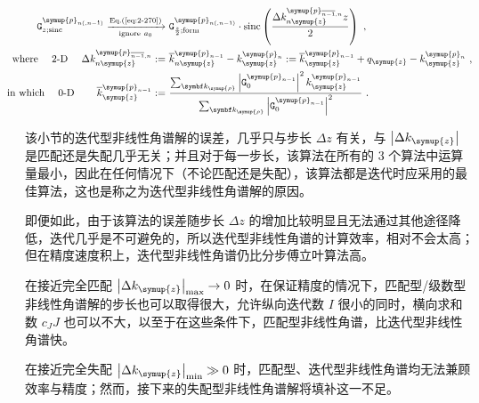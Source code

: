 \begin{subequations} \label{eq:2-287}
	\abovedisplayskip=13pt
	\belowdisplayskip=13pt
	\begin{align}
		\hspace{-1.8em} {\mathtt{G}}^{\symup{p}_{n(,n-1)}}_{z;\text{sinc}} \xrightarrow[\text{ignore}\ a_0]{\text{Eq.(\ref{eq:2-270})}} &\ {\mathtt{G}}^{\symup{p}_{n(,n-1)}}_{\frac{ z }{ 2 };\text{form}} \cdot \text{sinc} \left( \frac{ \Delta k^{\symup{p}_{\overline{n-1},n}}_{n\symup{z}} z }{ 2 } \right) \label{eq:2-287a}~, \\ \hspace{-1.8em} \text{where}\ \ \ \ \text{2-D}\ \ \ \ \Delta k^{\symup{p}_{\overline{n-1},n}}_{n\symup{z}} :=&\ \overline{k}^{\symup{p}_{n-1}}_{n\symup{z}} - k^{\symup{p}_{n}}_{\symup{z}} := \overline{k}^{\symup{p}_{n-1}}_{\symup{z}} + q_{\symup{z}} - k^{\symup{p}_{n}}_{\symup{z}} \label{eq:2-287b}~, \\ \hspace{-1.8em} \text{in which} \ \ \ \ \text{0-D} \hspace{2.2em} \overline{k}^{\symup{p}_{n-1}}_{\symup{z}} :=&\ \frac{ \sum_{\symbf k_{\symup{\rho}}} \left| {\mathtt{G}}^{\symup{p}_{n-1}}_{0} \right|^2 k^{\symup{p}_{n-1}}_{\symup{z}} }{ \sum_{\symbf k_{\symup{\rho}}} \left| {\mathtt{G}}^{\symup{p}_{n-1}}_{0} \right|^2 } \label{eq:2-287c}~.
	\end{align}
\end{subequations}

该小节的迭代型非线性角谱解的误差，几乎只与步长 $\Delta z$ 有关，与 $\left|\Delta k_{\symup{z}}\right|$ 是匹配还是失配几乎无关；并且对于每一步长，该算法在所有的 3 个算法中运算量最小，因此在任何情况下（不论匹配还是失配），该算法都是迭代时应采用的最佳算法，这也是称之为迭代型非线性角谱解的原因。

即便如此，由于该算法的误差随步长 $\Delta z$ 的增加比较明显且无法通过其他途径降低，迭代几乎是不可避免的，所以迭代型非线性角谱的计算效率，相对不会太高；但在精度速度积上，迭代型非线性角谱仍比分步傅立叶算法高。

在接近完全匹配 $\left|\Delta k_{\symup{z}}\right|_{\max} \to 0$ 时，在保证精度的情况下，匹配型/级数型非线性角谱解的步长也可以取得很大，允许纵向迭代数 $I$ 很小的同时，横向求和数 $c_J J$ 也可以不大，以至于在这些条件下，匹配型非线性角谱，比迭代型非线性角谱快。

在接近完全失配 $\left|\Delta k_{\symup{z}}\right|_{\min} \gg 0$ 时，匹配型、迭代型非线性角谱均无法兼顾效率与精度；然而，接下来的失配型非线性角谱解将填补这一不足。

